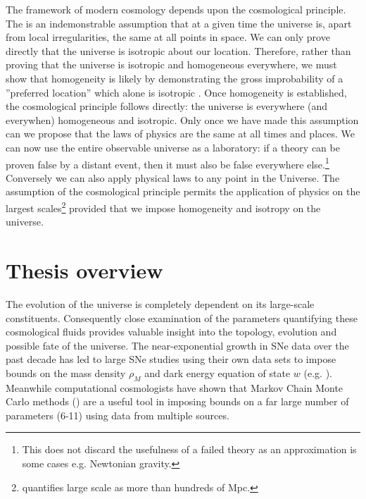 The framework of modern cosmology depends upon the cosmological principle. The is an indemonstrable assumption that at a given time the universe is, apart from local irregularities, the same at all points in space. We can only prove directly that the universe is isotropic about our location. Therefore, rather than proving that the universe is isotropic and homogeneous everywhere, we must show that homogeneity is likely by demonstrating the gross improbability of a ”preferred location” which alone is isotropic \cite{Harrison1993}. Once homogeneity is established, the cosmological principle follows directly: the universe is everywhere (and everywhen) homogeneous and isotropic. Only once we have made this assumption can we propose that the laws of physics are the same at all times and places. We can now use the entire observable universe as a laboratory: if a theory can be proven false by a distant event, then it must also be false everywhere else.\footnote{This does not discard the usefulness of a failed theory as an approximation is some cases e.g. Newtonian gravity.} Conversely we can also apply physical laws to any point in the Universe. The assumption of the cosmological principle permits the application of physics on the largest scales\footnote{\cite{Hartle2003} quantifies large scale as more than hundreds of Mpc.} provided that we impose homogeneity and isotropy on the universe.







\section{Thesis overview}
\label{sec:thesis-overview}

The evolution of the universe is completely dependent on its large-scale constituents. Consequently close examination of the parameters quantifying these cosmological fluids provides valuable insight into the topology, evolution and possible fate of the universe. The near-exponential growth in SNe data over the past decade \cite{Lidman2010b} has led to large SNe studies using their own data sets to impose bounds on the mass density $\rho_M$ and dark energy equation of state $w$ (e.g. \cite{Hicken2009,Riess2007,Amanullah2010,Kowalski2008}). Meanwhile computational cosmologists \cite{LewisBridle2002} have shown that Markov Chain Monte Carlo methods (\mcmc{}) are a useful tool in imposing bounds on a far large number of parameters (6-11) using data from multiple sources. 


